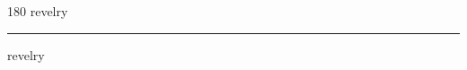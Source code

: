 
\begin{frame}
\begin{center}
\begin{turn}{180}
{\fontsize{2.5cm}{1em}\selectfont revelry}
\end{turn}
\vspace{1em}\par  
\hrule
\vspace{1em}\par  
{\fontsize{2.5cm}{1em}\selectfont revelry}
\end{center}
\end{frame}
